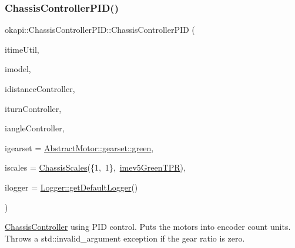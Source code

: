 \subsubsection{\texorpdfstring{ChassisControllerPID()}{ChassisControllerPID()}\hspace{0.1cm}{\footnotesize\ttfamily [1/3]}}
{\footnotesize\ttfamily okapi\+::\+Chassis\+Controller\+P\+I\+D\+::\+Chassis\+Controller\+P\+ID (\begin{DoxyParamCaption}\item[{const \mbox{\hyperlink{classokapi_1_1TimeUtil}{Time\+Util}} \&}]{itime\+Util,  }\item[{std\+::shared\+\_\+ptr$<$ \mbox{\hyperlink{classokapi_1_1ChassisModel}{Chassis\+Model}} $>$}]{imodel,  }\item[{std\+::unique\+\_\+ptr$<$ \mbox{\hyperlink{classokapi_1_1IterativePosPIDController}{Iterative\+Pos\+P\+I\+D\+Controller}} $>$}]{idistance\+Controller,  }\item[{std\+::unique\+\_\+ptr$<$ \mbox{\hyperlink{classokapi_1_1IterativePosPIDController}{Iterative\+Pos\+P\+I\+D\+Controller}} $>$}]{iturn\+Controller,  }\item[{std\+::unique\+\_\+ptr$<$ \mbox{\hyperlink{classokapi_1_1IterativePosPIDController}{Iterative\+Pos\+P\+I\+D\+Controller}} $>$}]{iangle\+Controller,  }\item[{const \mbox{\hyperlink{structokapi_1_1AbstractMotor_1_1GearsetRatioPair}{Abstract\+Motor\+::\+Gearset\+Ratio\+Pair}} \&}]{igearset = {\ttfamily \mbox{\hyperlink{classokapi_1_1AbstractMotor_a88aaa6ea2fa10f5520a537bbf26774d5a9f27410725ab8cc8854a2769c7a516b8}{Abstract\+Motor\+::gearset\+::green}}},  }\item[{const \mbox{\hyperlink{classokapi_1_1ChassisScales}{Chassis\+Scales}} \&}]{iscales = {\ttfamily \mbox{\hyperlink{classokapi_1_1ChassisScales}{Chassis\+Scales}}(\{1,~1\},~\mbox{\hyperlink{namespaceokapi_a5263bab3bfecd482a573b6d04fb584ac}{imev5\+Green\+T\+PR}})},  }\item[{std\+::shared\+\_\+ptr$<$ \mbox{\hyperlink{classokapi_1_1Logger}{Logger}} $>$}]{ilogger = {\ttfamily \mbox{\hyperlink{classokapi_1_1Logger_a5053cf778b4b55acba788a3797dc96d2}{Logger\+::get\+Default\+Logger}}()} }\end{DoxyParamCaption})}

\mbox{\hyperlink{classokapi_1_1ChassisController}{Chassis\+Controller}} using P\+ID control. Puts the motors into encoder count units. Throws a {\ttfamily std\+::invalid\+\_\+argument} exception if the gear ratio is zero.


